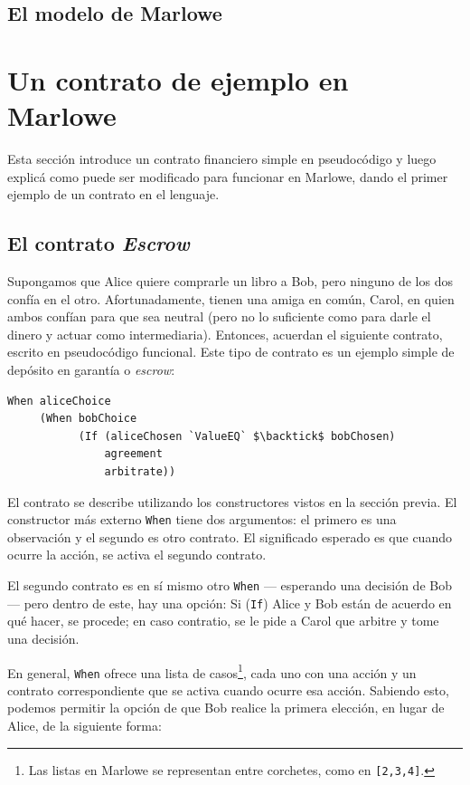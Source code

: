 \documentclass[12pt]{book}
\begin{document}
\subsection{El modelo de Marlowe}



\section{Un contrato de ejemplo en Marlowe}

Esta sección introduce un contrato financiero simple en pseudocódigo y luego explicá como puede ser modificado para funcionar en Marlowe, dando el primer ejemplo de un contrato en el lenguaje.

\subsection{El contrato \textit{Escrow}}

Supongamos que Alice quiere comprarle un libro a Bob, pero ninguno de los dos confía en el otro. Afortunadamente, tienen una amiga en común, Carol, en quien ambos confían para que sea neutral (pero no lo suficiente como para darle el dinero y actuar como intermediaria). Entonces, acuerdan el siguiente contrato, escrito en pseudocódigo funcional. Este tipo de contrato es un ejemplo simple de depósito en garantía o \textit{escrow}:


\begin{lstlisting}[style=Haskell-cardano, language=Marlowe, caption=Primer pseudocódigo del contrato Escrow.]
When aliceChoice
     (When bobChoice
           (If (aliceChosen `ValueEQ` $\backtick$ bobChosen)
               agreement
               arbitrate))
\end{lstlisting}


El contrato se describe utilizando los constructores vistos en la sección previa. El constructor más externo \texttt{When} tiene dos argumentos: el primero es una observación y el segundo es otro contrato. El significado esperado es que cuando ocurre la acción, se activa el segundo contrato.

El segundo contrato es en sí mismo otro \texttt{When} --- esperando una decisión de Bob --- pero dentro de este, hay una opción: Si (\texttt{If}) Alice y Bob están de acuerdo en qué hacer, se procede; en caso contratio, se le pide a Carol que arbitre y tome una decisión.

En general, \texttt{When} ofrece una lista de casos\footnote{Las listas en Marlowe se representan entre corchetes, como en \texttt{[2,3,4]}.}, cada uno con una acción y un contrato correspondiente que se activa cuando ocurre esa acción. Sabiendo esto, podemos permitir la opción de que Bob realice la primera elección, en lugar de Alice, de la siguiente forma:
\end{document}
